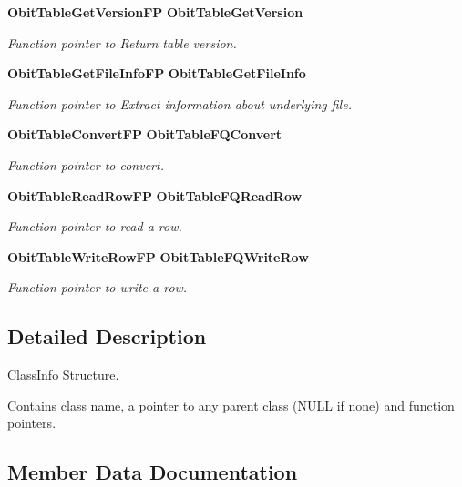 \begin{CompactItemize}
{\bf Obit\-Table\-Get\-Version\-FP} {\bf Obit\-Table\-Get\-Version}
\begin{CompactList}\small\item\em Function pointer to Return table version. \item\end{CompactList}\item 
{\bf Obit\-Table\-Get\-File\-Info\-FP} {\bf Obit\-Table\-Get\-File\-Info}
\begin{CompactList}\small\item\em Function pointer to Extract information about underlying file. \item\end{CompactList}\item 
{\bf Obit\-Table\-Convert\-FP} {\bf Obit\-Table\-FQConvert}
\begin{CompactList}\small\item\em Function pointer to convert. \item\end{CompactList}\item 
{\bf Obit\-Table\-Read\-Row\-FP} {\bf Obit\-Table\-FQRead\-Row}
\begin{CompactList}\small\item\em Function pointer to read a row. \item\end{CompactList}\item 
{\bf Obit\-Table\-Write\-Row\-FP} {\bf Obit\-Table\-FQWrite\-Row}
\begin{CompactList}\small\item\em Function pointer to write a row. \item\end{CompactList}\end{CompactItemize}


\subsection{Detailed Description}
Class\-Info Structure. 

Contains class name, a pointer to any parent class (NULL if none) and function pointers. 



\subsection{Member Data Documentation}
